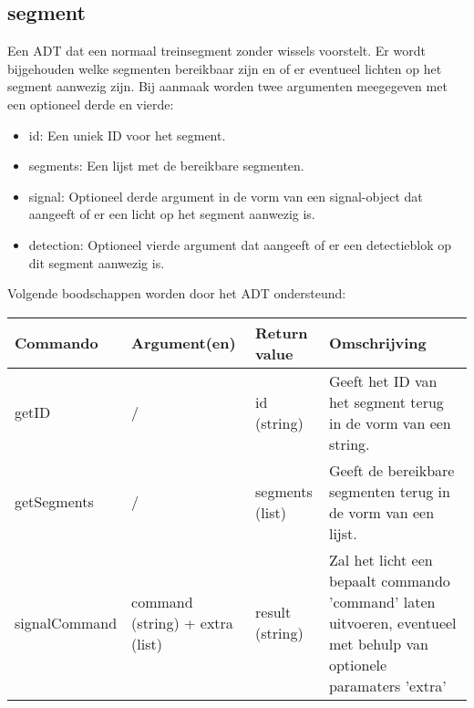 \documentclass{article}
\begin{document}
\subsection{segment} %
Een ADT dat een normaal treinsegment zonder wissels voorstelt. Er wordt bijgehouden welke segmenten bereikbaar zijn en of er eventueel lichten op het segment aanwezig zijn. Bij aanmaak worden twee argumenten meegegeven met een optioneel derde en vierde:
\begin{itemize}
  \item id: Een uniek ID voor het segment.
  \item segments: Een lijst met de bereikbare segmenten.
  \item signal: Optioneel derde argument in de vorm van een signal-object dat aangeeft of er een licht op het segment aanwezig is.
  \item detection: Optioneel vierde argument dat aangeeft of er een detectieblok op dit segment aanwezig is.
\end{itemize}
Volgende boodschappen worden door het ADT ondersteund:
\begin{center}
    \begin{tabular}{ | l | l | l | p{6cm} |}
    \hline
    Commando & Argument(en) & Return value & Omschrijving \\ \hline
    getID & / & id (string) & Geeft het ID van het segment terug in de vorm van een string. \\ \hline
    getSegments & / & segments (list) & Geeft de bereikbare segmenten terug in de vorm van een lijst. \\ \hline
    signalCommand & command (string) + extra (list) & result (string) & Zal het licht een bepaalt commando 'command' laten uitvoeren, eventueel met behulp van optionele paramaters 'extra' \\ \hline
    \end{tabular}
\end{center}
\end{document}
